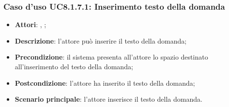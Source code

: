 	\subsubsection{Caso d'uso UC8.1.7.1: Inserimento testo della domanda}
	\begin{itemize}
		\item
		\textbf{Attori}: \uau, \uaupro;
		\item		
		\textbf{Descrizione}: l'attore può inserire il testo della domanda;
		\item
		\textbf{Precondizione}: il sistema presenta all'attore lo spazio destinato all'inserimento del testo della domanda;
		\item \textbf{Postcondizione}: l'attore ha inserito il testo della domanda;
		\item \textbf{Scenario principale}: l'attore inserisce il testo della domanda. 
	\end{itemize}

